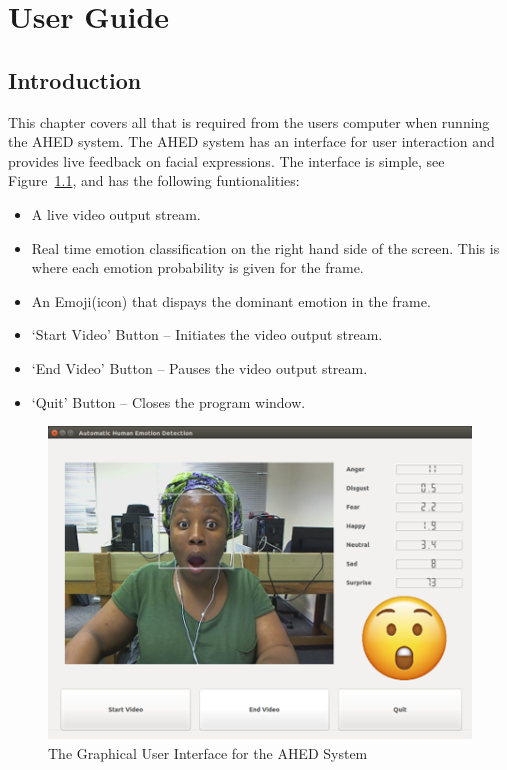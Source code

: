 \appendix
\renewcommand{\chaptermark}[1]%
   {\markboth{Appendix \thechapter. #1}{}}
\setcounter{chapter}{0}

\chapter{User Guide} %
\label{appendixA}
%


\section{Introduction} %
This chapter covers all that is required from the users computer when running the AHED system. The AHED system has an interface for user interaction and provides live feedback on facial expressions. The interface is simple, see Figure~\ref{fig:gui}, and has the following funtionalities:
\begin{itemize}
\item A live video output stream. 
\item Real time emotion classification on the right hand side of the screen. This is where each emotion probability is given for the frame.
\item An Emoji(icon) that dispays the dominant emotion in the frame.
\item `Start Video' Button -- Initiates the video output stream.
\item `End Video' Button -- Pauses the video output stream.
\item `Quit' Button -- Closes the program window.
\end{itemize}
\begin{figure}[H]
  \centering
  \includegraphics[scale= 0.8]{gui}
  \caption{The Graphical User Interface for the AHED System}
  \label{fig:gui}
\end{figure} 



